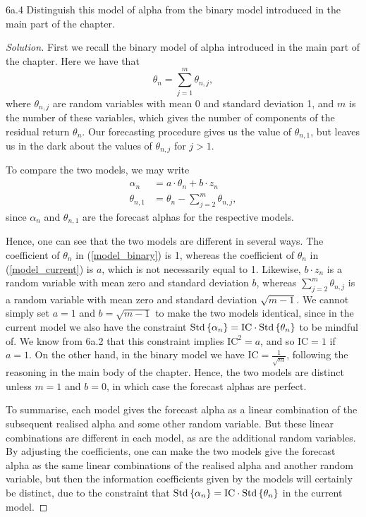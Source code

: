 \begin{problem}{6a.4}
Distinguish this model of alpha from the binary model introduced in the main part of the chapter.
\end{problem}
\begin{proof}[Solution]
First we recall the binary model of alpha introduced in the main part of the chapter. Here we have that \[\theta_{n} = \sum_{j = 1}^{m}\theta_{n, j},\] where $\theta_{n,j}$ are random variables with mean 0 and standard deviation 1, and $m$ is the number of these variables, which gives the number of components of the residual return $\theta_{n}$. Our forecasting procedure gives us the value of $\theta_{n,1}$, but leaves us in the dark about the values of $\theta_{n, j}$ for $j > 1$.

To compare the two models, we may write \setcounter{equation}{0}
\begin{align}
\label{model_current}\alpha_{n} &= a\cdot\theta_{n} + b \cdot z_{n}\\
\theta_{n,1} &= \theta_{n} - \sum_{j = 2}^{m}\theta_{n, j},\label{model_binary}
\end{align}
since $\alpha_{n}$ and $\theta_{n, 1}$ are the forecast alphas for the respective models.

Hence, one can see that the two models are different in several ways. The coefficient of $\theta_{n}$ in (\ref{model_binary}) is 1, whereas the coefficient of $\theta_{n}$ in (\ref{model_current}) is $a$, which is not necessarily equal to 1. Likewise, $b \cdot z_{n}$ is a random variable with mean zero and standard deviation $b$, whereas $\sum_{j = 2}^{m}\theta_{n, j}$ is a random variable with mean zero and standard deviation $\sqrt{m - 1}$. We cannot simply set $a = 1$ and $b = \sqrt{m - 1}$ to make the two models identical, since in the current model we also have the constraint $\mathrm{Std}\left\lbrace\alpha_{n}\right\rbrace = \mathrm{IC} \cdot \mathrm{Std}\left\lbrace\theta_{n}\right\rbrace$ to be mindful of. We know from 6a.2 that this constraint implies $\mathrm{IC}^{2} = a$, and so $\mathrm{IC} = 1$ if $a = 1$. On the other hand, in the binary model we have $\mathrm{IC} = \frac{1}{\sqrt{m}}$, following the reasoning in the main body of the chapter. Hence, the two models are distinct unless $m = 1$ and $b = 0$, in which case the forecast alphas are perfect.

To summarise, each model gives the forecast alpha as a linear combination of the subsequent realised alpha and some other random variable. But these linear combinations are different in each model, as are the additional random variables. By adjusting the coefficients, one can make the two models give the forecast alpha as the same linear combinations of the realised alpha and another random variable, but then the information coefficients given by the models will certainly be distinct, due to the constraint that $\mathrm{Std}\left\lbrace\alpha_{n}\right\rbrace = \mathrm{IC} \cdot \mathrm{Std}\left\lbrace\theta_{n}\right\rbrace$ in the current model.
\end{proof}